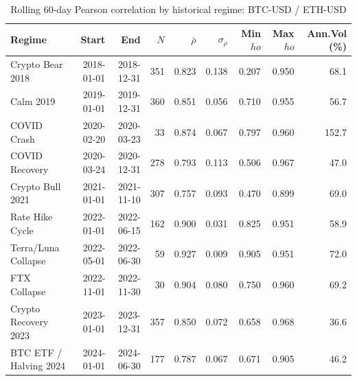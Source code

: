 \begin{table}[H]
\centering
\small
\caption{Rolling 60-day Pearson correlation by historical regime: BTC-USD / ETH-USD}
\label{tab:regime_corr_BTCUSDETHUSD}
\begin{tabular}{lrrrrrrrr}
\toprule
Regime & Start & End & $N$ & $\bar{\rho}$ & $\sigma_\rho$ & Min $
ho$ & Max $
ho$ & Ann.Vol (\%) \\
\midrule
Crypto Bear 2018 & 2018-01-01 & 2018-12-31 & 351 & 0.823 & 0.138 & 0.207 & 0.950 & 68.1 \\
Calm 2019 & 2019-01-01 & 2019-12-31 & 360 & 0.851 & 0.056 & 0.710 & 0.955 & 56.7 \\
COVID Crash & 2020-02-20 & 2020-03-23 & 33 & 0.874 & 0.067 & 0.797 & 0.960 & 152.7 \\
COVID Recovery & 2020-03-24 & 2020-12-31 & 278 & 0.793 & 0.113 & 0.506 & 0.967 & 47.0 \\
Crypto Bull 2021 & 2021-01-01 & 2021-11-10 & 307 & 0.757 & 0.093 & 0.470 & 0.899 & 69.0 \\
Rate Hike Cycle & 2022-01-01 & 2022-06-15 & 162 & 0.900 & 0.031 & 0.825 & 0.951 & 58.9 \\
Terra/Luna Collapse & 2022-05-01 & 2022-06-30 & 59 & 0.927 & 0.009 & 0.905 & 0.951 & 72.0 \\
FTX Collapse & 2022-11-01 & 2022-11-30 & 30 & 0.904 & 0.080 & 0.750 & 0.960 & 69.2 \\
Crypto Recovery 2023 & 2023-01-01 & 2023-12-31 & 357 & 0.850 & 0.072 & 0.658 & 0.968 & 36.6 \\
BTC ETF / Halving 2024 & 2024-01-01 & 2024-06-30 & 177 & 0.787 & 0.067 & 0.671 & 0.905 & 46.2 \\
\bottomrule
\end{tabular}
\end{table}